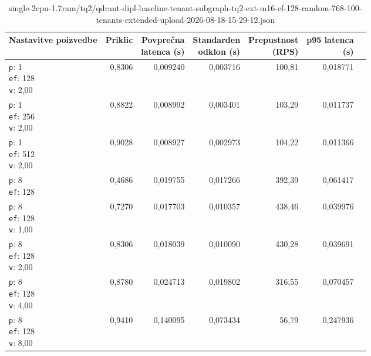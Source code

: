 \begin{table}[htbp]
  \centering
\small
  \caption{single-2cpu-1.7ram/tq2/qdrant-dipl-baseline-tenant-subgraph-tq2-ext-m16-ef-128-random-768-100-tenants-extended-upload-2026-08-18-15-29-12.json}
  \label{tab:single-2cpu-1.7ram:tq2:qdrant-dipl-baseline-tenant-subgraph-tq2-ext-m16-ef-128-random-768-100-tenants-extended-upload-2026-08-18-15-29-12.json}
  \begin{tabularx}{\textwidth}{Xrrrrrr}
    \toprule
    Nastavitve poizvedbe & Priklic & \makecell{Povprečna\\latenca (s)} & \makecell{Standarden\\odklon (s)} & \makecell{Prepustnost\\(RPS)} & \makecell{p95 latenca\\(s)}  \\
    \midrule
    \makecell{\texttt{p}: 1\\\texttt{ef}: 128\\\texttt{v}: 2,00} & 0,8306 & 0,009240 & 0,003716 & 100,81 & 0,018771 \\
    \makecell{\texttt{p}: 1\\\texttt{ef}: 256\\\texttt{v}: 2,00} & 0,8822 & 0,008992 & 0,003401 & 103,29 & 0,011737 \\
    \makecell{\texttt{p}: 1\\\texttt{ef}: 512\\\texttt{v}: 2,00} & 0,9028 & 0,008927 & 0,002973 & 104,22 & 0,011366 \\
    \makecell{\texttt{p}: 8\\\texttt{ef}: 128} & 0,4686 & 0,019755 & 0,017266 & 392,39 & 0,061417 \\
    \makecell{\texttt{p}: 8\\\texttt{ef}: 128\\\texttt{v}: 1,00} & 0,7270 & 0,017703 & 0,010357 & 438,46 & 0,039976 \\
    \makecell{\texttt{p}: 8\\\texttt{ef}: 128\\\texttt{v}: 2,00} & 0,8306 & 0,018039 & 0,010090 & 430,28 & 0,039691 \\
    \makecell{\texttt{p}: 8\\\texttt{ef}: 128\\\texttt{v}: 4,00} & 0,8780 & 0,024713 & 0,019802 & 316,55 & 0,070457 \\
    \makecell{\texttt{p}: 8\\\texttt{ef}: 128\\\texttt{v}: 8,00} & 0,9410 & 0,140095 & 0,073434 & 56,79 & 0,247936 \\

\end{tabularx}
\end{table}
